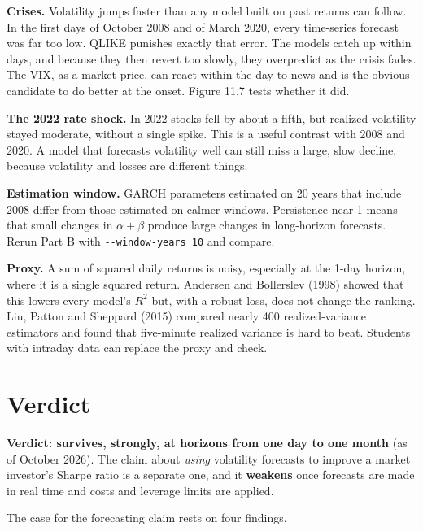 \textbf{Crises.} Volatility jumps faster than any model built on past returns can follow. In the first days of October 2008 and of March 2020, every time-series forecast was far too low. QLIKE punishes exactly that error. The models catch up within days, and because they then revert too slowly, they overpredict as the crisis fades. The VIX, as a market price, can react within the day to news and is the obvious candidate to do better at the onset. Figure 11.7 tests whether it did.

\textbf{The 2022 rate shock.} In 2022 stocks fell by about a fifth, but realized volatility stayed moderate, without a single spike. This is a useful contrast with 2008 and 2020. A model that forecasts volatility well can still miss a large, slow decline, because volatility and losses are different things.

\textbf{Estimation window.} GARCH parameters estimated on 20 years that include 2008 differ from those estimated on calmer windows. Persistence near 1 means that small changes in $\alpha + \beta$ produce large changes in long-horizon forecasts. Rerun Part B with \texttt{-{}-window-years 10} and compare.

\textbf{Proxy.} A sum of squared daily returns is noisy, especially at the 1-day horizon, where it is a single squared return. Andersen and Bollerslev (1998) showed that this lowers every model's $R^2$ but, with a robust loss, does not change the ranking. Liu, Patton and Sheppard (2015) compared nearly 400 realized-variance estimators and found that five-minute realized variance is hard to beat. Students with intraday data can replace the proxy and check.

\section{Verdict}
\label{sec:11-verdict}

\begin{callout}
\textbf{Verdict: survives, strongly, at horizons from one day to one month} (as of October 2026). The claim about \emph{using} volatility forecasts to improve a market investor's Sharpe ratio is a separate one, and it \textbf{weakens} once forecasts are made in real time and costs and leverage limits are applied.
\end{callout}

The case for the forecasting claim rests on four findings.

